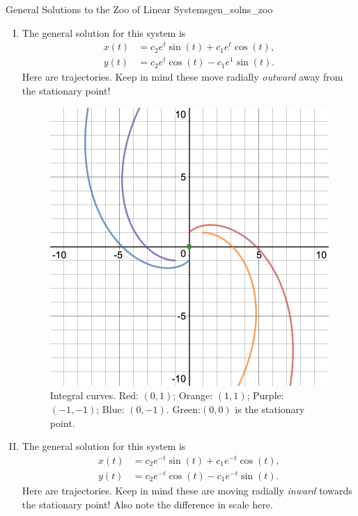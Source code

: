 \begin{ex}{General Solutions to the Zoo of Linear Systems}{gen_solns_zoo}
\begin{enumerate}[(I)]
\begin{figure}[H]
                \caption{Integral curves. Red: $(0,1)$; Orange: $(1,1)$; Purple: $(-1,-1)$; Blue: $(0,-1)$. Green are all stationary points.}
                \label{fig:my_label}
            \end{figure}
            \item The general solution for this system is
            \begin{align*}
                x(t)&= c_2 e^t \sin(t)+c_1e^t\cos(t),\\
                y(t)&= c_2 e^t \cos(t) - c_1e^1 \sin(t).
            \end{align*}
            Here are trajectories. Keep in mind these move radially \emph{outward} away from the stationary point!
                        \begin{figure}[H]
                \centering
                \includegraphics[width=.6\textwidth]{Figures/x+y-x+yintegralcurves.png}
                \caption{Integral curves. Red: $(0,1)$; Orange: $(1,1)$; Purple: $(-1,-1)$; Blue: $(0,-1)$. Green:$(0,0)$ is the stationary point.}
                \label{fig:my_label}
            \end{figure}
            \item The general solution for this system is
            \begin{align*}
                x(t)&=c_2 e^{-t}\sin(t)+c_1 e^{-t}\cos(t),\\
                y(t)&=c_2e^{-t}\cos(t)-c_1e^{-t}\sin(t).
            \end{align*}
            Here are trajectories. Keep in mind these are moving radially \emph{inward} towards the stationary point! Also note the difference in scale here.
            \begin{figure}[H]
                \centering

\end{figure}
\end{enumerate}
\end{ex}
